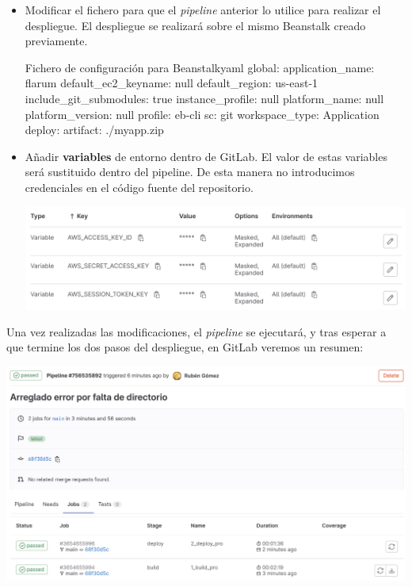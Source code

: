 \documentclass{\ClassPath/viu-tfm-template}
\begin{document}
\begin{itemize}
    \item Modificar el fichero  para que el \textit{pipeline} anterior lo utilice para realizar el despliegue. El despliegue se realizará sobre el mismo Beanstalk creado previamente.

    \begin{mycode}{Fichero de configuración para Beanstalk}{yaml}{}
global:
  application_name: flarum
  default_ec2_keyname: null
  default_region: us-east-1
  include_git_submodules: true
  instance_profile: null
  platform_name: null
  platform_version: null
  profile: eb-cli
  sc: git
  workspace_type: Application
deploy:
  artifact: ./myapp.zip\end{mycode}

    \item Añadir \textbf{variables} de entorno dentro de GitLab. El valor de estas variables será sustituido dentro del pipeline. De esta manera no introducimos credenciales en el código fuente del repositorio.
    \begin{center}
        \includegraphics[frame,width=\linewidth]{img/gitlab-vars.png}
    \end{center}
\end{itemize}

Una vez realizadas las modificaciones, el \textit{pipeline} se ejecutará, y tras esperar a que termine los dos pasos del despliegue, en GitLab veremos un resumen:

\begin{center}
    \includegraphics[frame,width=\linewidth]{img/gitlab-pipeline.png}
\end{center}
\end{document}
